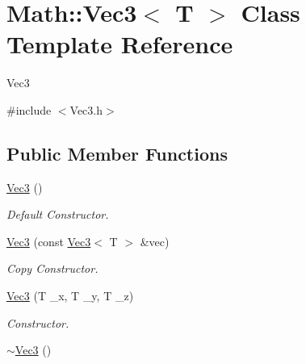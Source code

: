 \hypertarget{classMath_1_1Vec3}{
\section{Math::Vec3$<$ T $>$ Class Template Reference}
\label{classMath_1_1Vec3}
}


Vec3  


{\ttfamily \#include $<$Vec3.h$>$}\subsection*{Public Member Functions}
\begin{DoxyCompactItemize}
\item 
\hypertarget{classMath_1_1Vec3_aca18cd7260a307b725e9389cc15e7afd}{
\hyperlink{classMath_1_1Vec3_aca18cd7260a307b725e9389cc15e7afd}{Vec3} ()}
\label{classMath_1_1Vec3_aca18cd7260a307b725e9389cc15e7afd}

\begin{DoxyCompactList}\small\item\em Default Constructor. \item\end{DoxyCompactList}\item 
\hypertarget{classMath_1_1Vec3_a5f26f3ac7c10e9d3ec8ce5354fda5cb2}{
\hyperlink{classMath_1_1Vec3_a5f26f3ac7c10e9d3ec8ce5354fda5cb2}{Vec3} (const \hyperlink{classMath_1_1Vec3}{Vec3}$<$ T $>$ \&vec)}
\label{classMath_1_1Vec3_a5f26f3ac7c10e9d3ec8ce5354fda5cb2}

\begin{DoxyCompactList}\small\item\em Copy Constructor. \item\end{DoxyCompactList}\item 
\hypertarget{classMath_1_1Vec3_a7c8715a04eb2b9f7b67353778d3f3307}{
\hyperlink{classMath_1_1Vec3_a7c8715a04eb2b9f7b67353778d3f3307}{Vec3} (T \_\-x, T \_\-y, T \_\-z)}
\label{classMath_1_1Vec3_a7c8715a04eb2b9f7b67353778d3f3307}

\begin{DoxyCompactList}\small\item\em Constructor. \item\end{DoxyCompactList}\item 
\hypertarget{classMath_1_1Vec3_addc9fee6ab034c6748c9c10382f69728}{
\hyperlink{classMath_1_1Vec3_addc9fee6ab034c6748c9c10382f69728}{$\sim$Vec3} ()}
\label{classMath_1_1Vec3_addc9fee6ab034c6748c9c10382f69728}


\end{DoxyCompactItemize}
